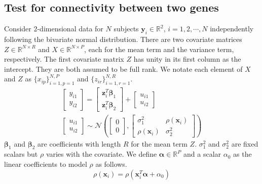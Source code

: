 \documentclass[aoas,authoryear, preprint]{imsart}
\numberwithin{equation}{section}
\theoremstyle{plain}
\begin{document}
\subsection{Test for connectivity between two genes \label{sec:framework2}}
Consider 2-dimensional data for $N$ subjects $\bm{y}_i \in \mathbb{R}^2$, $i = 1, 2, \cdots, N$ independently following the bivariate normal distribution. There are two covariate matrices $Z \in \mathbb{R}^{N \times R}$ and $X \in \mathbb{R}^{N \times P}$, each for the mean term and the variance term, respectively. The first covariate matrix $Z$ has unity in its first column as the intercept. They are both assumed to be full rank. We notate each element of $X$ and $Z$ as $\{x_{ip}\}_{i=1,p=1}^{N,P}$ and $\{z_{ir}\}_{i=1,r=1}^{N,R}$.
\begin{equation}
\begin{multlined}
    \begin{bmatrix} y_{i1} \\ y_{i2} \end{bmatrix} = 
    \begin{bmatrix} \bm{z}_i^T \bm{\beta}_1 \\ \bm{z}_i^T \bm{\beta}_2 \end{bmatrix} + 
    \begin{bmatrix} {u_{i1}} \\ u_{i2} \end{bmatrix}\\
    \begin{bmatrix} {u_{i1}} \\ u_{i2} \end{bmatrix} 
    \sim \mathcal{N}\left(
        \begin{bmatrix} 0 \\ 0 \end{bmatrix}, 
        \begin{bmatrix} \sigma_1^2 & \rho(\bm{x}_i) \\ 
        \rho(\bm{x}_i) & \sigma_2^2 \end{bmatrix}
    \right)
    \end{multlined}
    \label{eq:framework_2genes}
\end{equation}
$\bm{\beta}_1$ and $\bm{\beta}_2$ are coefficients with length $R$  for the mean term $Z$. $\sigma_1^2$ and $\sigma_2^2$ are fixed scalars but $\rho$ varies with the covariate. We define $\bm{\alpha} \in \mathbb{R}^{P}$ and a scalar $\alpha_0$ as the linear coefficients to model $\rho$ as follows.
\begin{equation}
    \rho(\bm{x}_i) = \rho(\bm{x}_i^T\bm{\alpha} + \alpha_0) \label{eq:rho}
\end{equation}
\end{document}
